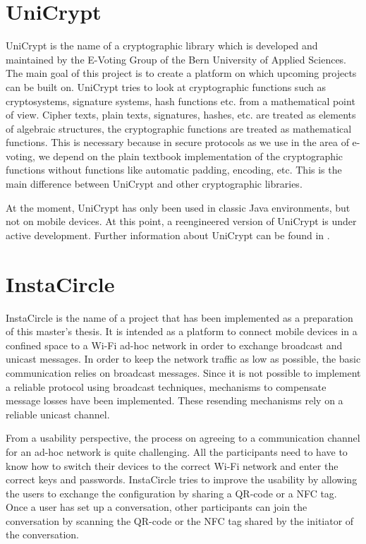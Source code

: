 \documentclass[numbers=noenddot, abstract=on, a4paper, headsepline,
footsepline, oneside, draft=off]{scrreprt}
\begin{document}
\section{UniCrypt}
\label{sec:unicrypt}
UniCrypt is the name of a cryptographic library which is developed and
maintained by the E-Voting Group of the Bern University of Applied Sciences. The
main goal of this project is to create a platform on which upcoming projects can
be built on.
UniCrypt tries to look at cryptographic functions such as cryptosystems,
signature systems, hash functions etc. from a mathematical point of view. Cipher
texts, plain texts, signatures, hashes, etc. are treated as elements of
algebraic structures, the cryptographic functions are treated as mathematical functions.
This is necessary because in secure protocols as we use in the area of e-voting,
we depend on the plain textbook implementation of the cryptographic functions
without functions like automatic padding, encoding, etc. This is the main
difference between UniCrypt and other cryptographic libraries.

At the moment, UniCrypt has only been used in classic Java environments, but not
on mobile devices. At this point, a reengineered version of UniCrypt is under
active development. Further information about UniCrypt can be found in \cite{ritter12}.

\section{InstaCircle}
\label{sec:instacircle}
InstaCircle is the name of a project that has been implemented as a preparation
of this master's thesis. It is intended as a platform to connect mobile devices
in a confined space to a Wi-Fi ad-hoc network in order to exchange broadcast
and unicast messages. In order to keep the network traffic as low as possible,
the basic communication relies on broadcast messages. Since it is not possible
to implement a reliable protocol using broadcast techniques, mechanisms to
compensate message losses have been implemented. These resending mechanisms rely
on a reliable unicast channel.

From a usability perspective, the process on agreeing to a communication channel
for an ad-hoc network is quite challenging. All the participants need to have
to know how to switch their devices to the correct Wi-Fi network and enter the
correct keys and passwords. InstaCircle tries to improve the usability by
allowing the users to exchange the configuration by sharing a QR-code or a NFC
tag. Once a user has set up a conversation, other participants can join the
conversation by scanning the QR-code or the NFC tag shared by the initiator of
the conversation.
\end{document}
